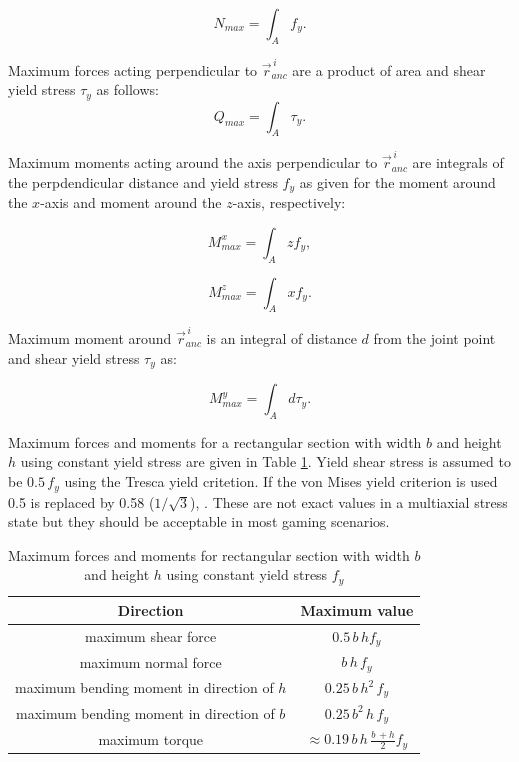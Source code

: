 \documentclass{jcgt}
\begin{document}
\begin{equation} \label{eq:fN}
N_{max}= \int_A f_y.
\end{equation}

Maximum forces acting perpendicular to $\vec{r}_{anc}^{\,i} $
are a product of area and shear yield stress $\tau_y$ as follows:
\begin{equation} \label{eq:fQ}
Q_{max}= \int_A \tau_y.
\end{equation}

Maximum moments acting around the axis perpendicular to $\vec{r}_{anc}^{\,i} $
are integrals of the perpdendicular distance 
and yield stress $f_y$ as given for the moment around the $x$-axis 
and moment around the $z$-axis, respectively:

\begin{equation} \label{eq:Mx}
M_{max}^x= \int_A z f_y,
\end{equation}

\begin{equation} \label{eq:Mz}
M_{max}^z= \int_A x f_y.
\end{equation}

Maximum moment around $\vec{r}_{anc}^{\,i} $
is an integral of distance $d$ from the joint point
and shear yield stress $\tau_y$ as: 

\begin{equation} \label{eq:My}
M_{max}^y= \int_A d \tau_y.
\end{equation}

Maximum forces and moments for a
rectangular section with width $b$ and height $h$ using constant yield stress
are given in Table \ref{tab:maxForces}.
Yield shear stress is assumed to be $ 0.5\, f_y$ using the Tresca yield critetion.
If the von Mises yield criterion is used 0.5 is replaced by 0.58 ($1/\sqrt{3}$), \cite{dowling}.
These are not exact values in a multiaxial stress state but they
should be acceptable in most gaming scenarios.

\begin {table}
\small
\begin{center}
\begin{tabular}{| c| c|}
\hline
{\bf Direction} & {\bf Maximum value}  \\ \hline
maximum shear force & $0.5\, b\, h f_y$ \\ \hline
maximum normal force & $b\, h\, f_y$  \\ \hline
maximum bending moment in direction of $h$& $0.25\, b\, h^2 \, f_y$  \\ \hline
maximum bending moment in direction of $b$ & $0.25\, b^2\, h\, f_y$  \\ \hline
maximum torque & $ \approx 0.19\, b\, h\, \frac{b\, + h}{2} f_y$  \\ \hline
\end{tabular}
\end{center}
\caption{Maximum forces and moments for 
rectangular section with width $b$ and height $h$ using constant yield stress $f_y$}
\label{tab:maxForces} 
\end {table}
\end{document}
